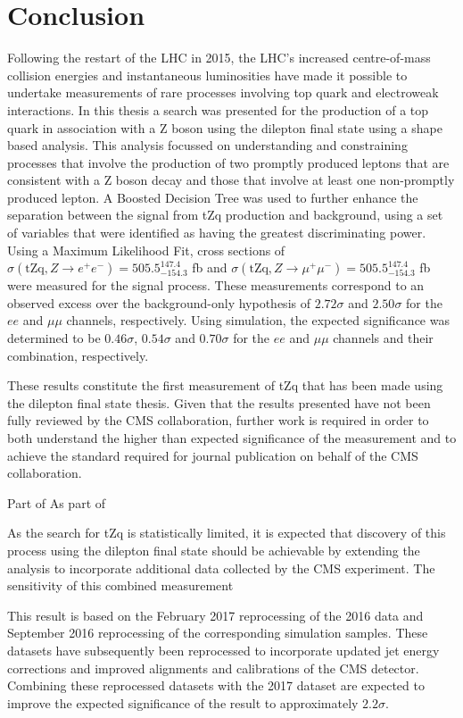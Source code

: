 \chapter{Conclusion}\label{chapter:conclusion}
Following the restart of the LHC in 2015, the LHC's increased centre-of-mass collision energies and instantaneous luminosities have made it possible to undertake measurements of rare processes involving top quark and electroweak interactions.
In this thesis a search was presented for the production of a top quark in association with a Z boson using the dilepton final state using a shape based analysis.
This analysis focussed on understanding and constraining processes that involve the production of two promptly produced leptons that are consistent with a Z boson decay and those that involve at least one non-promptly produced lepton.
A Boosted Decision Tree was used to further enhance the separation between the signal from tZq production and background, using a set of variables that were identified as having the greatest discriminating power.
Using a Maximum Likelihood Fit, cross sections of $\sigma (\textrm{tZq}, Z \rightarrow e^{+} e^{-}) = 505.5^{147.4}_{-154.3}$ fb and $\sigma (\textrm{tZq}, Z \rightarrow \mu^{+} \mu^{-}) = 505.5^{147.4}_{-154.3}$ fb were measured for the signal process.
These measurements correspond to an observed excess over the background-only hypothesis of $2.72\sigma$ and $2.50\sigma$ for the $ee$ and $\mu\mu$ channels, respectively.
Using simulation, the expected significance was determined to be $0.46\sigma$, $0.54\sigma$ and $0.70\sigma$ for the $ee$ and $\mu\mu$ channels and their combination, respectively.

These results constitute the first measurement of tZq that has been made using the dilepton final state thesis.
Given that the results presented have not been fully reviewed by the CMS collaboration, further work is required in order to both understand the higher than expected significance of the measurement and to achieve the standard required for journal publication on behalf of the CMS collaboration.

Part of 
As part of 

As the search for tZq is statistically limited, it is expected that discovery of this process using the dilepton final state should be achievable by extending the analysis to incorporate additional data collected by the CMS experiment.
The sensitivity of this combined measurement 

This result is based on the February 2017 reprocessing of the 2016 data and September 2016 reprocessing of the corresponding simulation samples.
These datasets have subsequently been reprocessed to incorporate updated jet energy corrections and improved alignments and calibrations of the CMS detector.
Combining these reprocessed datasets with the 2017 dataset are expected to improve the expected significance of the result to approximately $2.2\sigma$.

